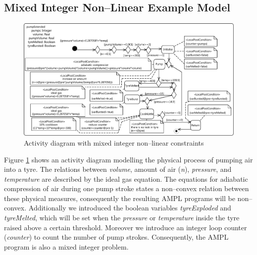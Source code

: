 \documentclass[runningheads,a4paper]{llncs}%
\newcommand{\OCLVar}[1]{\textit{#1}}
\begin{document}
\subsection{Mixed Integer Non--Linear Example Model}
\label{sec:exampleModelNonConvex}
\begin{figure}
\includegraphics[width=\textwidth]{../Thesis/pics/pumpTyre.pdf}
\caption{Activity diagram with mixed integer non--linear constraints}
\label{fig:pumpTyre}
\end{figure}
Figure \ref{fig:pumpTyre} shows an activity diagram modelling the physical
process of pumping air into a tyre. The relations between \OCLVar{volume},
amount of air (\OCLVar{n}), \OCLVar{pressure}, and \OCLVar{temperature} are
described by the ideal gas equation. The equations for adiabatic compression of
air during one pump stroke states a non--convex relation between these physical
measures, consequently the resulting AMPL programs will be non--convex. Additionally we introduced the boolean variables \OCLVar{tyreExploded}
and \OCLVar{tyreMelted}, which will be set when the \OCLVar{pressure} or
\OCLVar{temperature} inside the tyre raised above a certain threshold. Moreover
we introduce an integer loop counter (\OCLVar{counter}) to count the number of
pump strokes. Consequently, the AMPL program is also a mixed integer problem.
\end{document}
